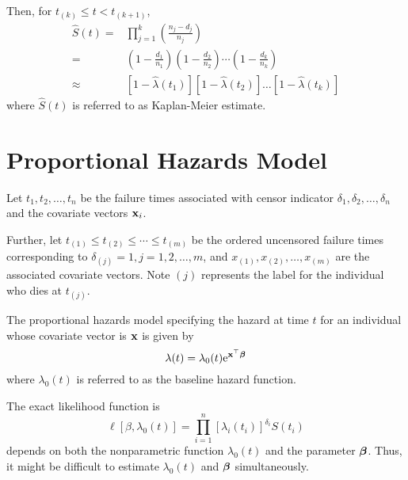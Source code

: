 Then, for \(t_{(k)}\leq t<t_{(k+1)}\),
\begin{equation}
	\begin{aligned}
		\hat{S}(t)= & \prod_{j=1}^{k}\left(\frac{n_{j}-d_{j}}{n_{j}}\right)                                                                                             \\
		=           & \left(1-\frac{d_{1}}{n_{1}}\right)\left(1-\frac{d_{2}}{n_{2}}\right) \cdots\left(1-\frac{d_{k}}{n_{k}}\right)                                     \\
		\approx     & \left[1-\hat{\lambda}\left(t_{1}\right)\right]\left[1-\hat{\lambda}\left(t_{2}\right)\right] \ldots\left[1-\hat{\lambda}\left(t_{k}\right)\right]
	\end{aligned}
\end{equation}
where \(\hat{S}(t)\) is referred to as Kaplan-Meier estimate.

\section{Proportional Hazards Model}

Let \(t_{1},t_{2},\ldots,t_{n}\) be the failure times associated with censor indicator \(\delta_{1},\delta_{2},\ldots,\delta_{n}\) and the covariate vectors \(\mathbf{x}_{i}\).

Further, let \(t_{(1)}\leq t_{(2)}\leq\cdots\leq t_{(m)}\) be the ordered uncensored failure times corresponding to \(\delta_{(j)}=1,j=1,2,\ldots,m\), and \(x_{(1)},x_{(2)},\ldots,x_{(m)}\) are the associated covariate vectors. Note \((j)\) represents the label for the individual who dies at \(t_{(j)}\).

The proportional hazards model specifying the hazard at time \(t\) for an individual whose covariate vector is \(\mathbf{x}\) is given by
\begin{equation}
	\lambda(t)=\lambda_{0}(t)\mathrm{e}^{\mathbf{x}^{\top}\boldsymbol{\beta}}
\end{equation}
where \(\lambda_{0}(t)\) is referred to as the baseline hazard function.

The exact likelihood function is
\begin{equation}
	\ell\left[\beta,\lambda_{0}(t)\right]=\prod_{i=1}^{n}\left[\lambda_{i}\left(t_{i}\right)\right]^{\delta_{i}}S\left(t_{i}\right)
\end{equation}
depends on both the nonparametric function \(\lambda_{0}(t)\) and the parameter \(\boldsymbol{\beta}\). Thus, it might be difficult to estimate \(\lambda_{0}(t)\) and \(\boldsymbol{\beta}\) simultaneously.

